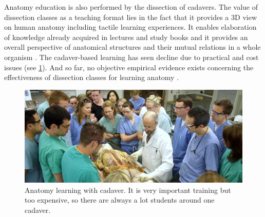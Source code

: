 Anatomy education is also performed by the dissection of cadavers.  The value of dissection classes as a teaching format lies in the fact that it provides a 3D view on human anatomy including tactile learning experiences. It enables elaboration of knowledge already acquired in lectures and study books and it provides an overall perspective of anatomical structures and their mutual relations in a whole organism \cite{McLachlan2004}. 
The cadaver-based learning has seen decline due to practical and cost issues (see \figurename{\ref{fig:2-bg:cadaver}}). And so far, no objective empirical evidence exists concerning the effectiveness of dissection classes for learning anatomy \cite{Frank2005}.
\begin{figure}
	\centering
	\includegraphics[width=0.8\linewidth]{figures/2-bg/cadaver}
	\caption{Anatomy learning with cadaver. It is very important training but too expensive, so there are always a lot students around one cadaver.}
	\label{fig:2-bg:cadaver}
\end{figure}

